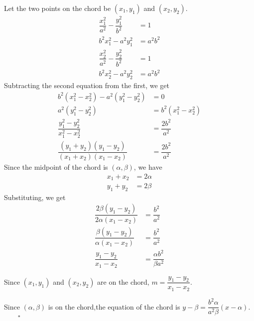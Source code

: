 \documentclass{report}
\newcommand{\eos}{ \qquad \square}
\begin{document}
\begin{enumerate}[leftmargin=*]
\begin{enumerate}
                    Let the two points on the chord be $(x_1, y_1)$ and $(x_2, y_2)$.
                    \begin{align*}
                        \dfrac{x_1^2}{a^2}-\dfrac{y_1^2}{b^2} & =1      \\
                        b^2x_1^2-a^2y_1^2                     & =a^2b^2 \\
                        \dfrac{x_2^2}{a^2}-\dfrac{y_2^2}{b^2} & =1      \\
                        b^2x_2^2-a^2y_2^2                     & =a^2b^2
                    \end{align*}
                    Subtracting the second equation from the first, we get
                    \begin{align*}
                        b^2(x_1^2-x_2^2) - a^2(y_1^2-y_2^2)            & =0                 \\
                        a^2(y_1^2-y_2^2)                               & =b^2(x_1^2-x_2^2)  \\
                        \dfrac{y_1^2-y_2^2}{x_1^2-x_2^2}               & =\dfrac{2b^2}{a^2} \\
                        \dfrac{(y_1+y_2)(y_1-y_2)}{(x_1+x_2)(x_1-x_2)} & =\dfrac{2b^2}{a^2}
                    \end{align*}
                    Since the midpoint of the chord is $(\alpha, \beta)$, we have
                    \begin{align*}
                        x_1+x_2 & = 2\alpha \\
                        y_1+y_2 & = 2\beta
                    \end{align*}
                    Substituting, we get
                    \begin{align*}
                        \dfrac{2\beta(y_1-y_2)}{2\alpha(x_1-x_2)} & =\dfrac{b^2}{a^2}              \\
                        \dfrac{\beta(y_1-y_2)}{\alpha(x_1-x_2)}   & =\dfrac{b^2}{a^2}              \\
                        \dfrac{y_1-y_2}{x_1-x_2}                  & =\dfrac{\alpha b^2}{\beta a^2}
                    \end{align*}

                    Since $(x_1, y_1)$ and $(x_2, y_2)$ are on the chord,
                    $m=\dfrac{y_1-y_2}{x_1-x_2}$.

                    Since $(\alpha, \beta)$ is on the chord,the equation of the chord is
                    $y-\beta=\dfrac{b^2 \alpha}{a^2 \beta}(x-\alpha)$. $\eos$


\end{enumerate}
\end{enumerate}
\end{document}
